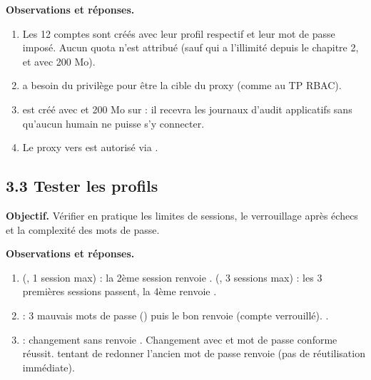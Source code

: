 \textbf{Observations et réponses.}
\begin{enumerate}
  \item Les 12 comptes sont créés avec leur profil respectif et leur mot de passe imposé. Aucun quota n'est attribué (sauf  qui a l'illimité depuis le chapitre 2, et  avec 200 Mo).
  \item {} a besoin du privilège  pour être la cible du proxy (comme  au TP RBAC).
  \item {} est créé avec  et 200 Mo sur  : il recevra les journaux d'audit applicatifs sans qu'aucun humain ne puisse s'y connecter.
  \item Le proxy  vers  est autorisé via .
\end{enumerate}

\subsection{3.3 Tester les profils}
\textbf{Objectif.} Vérifier en pratique les limites de sessions, le verrouillage après échecs et la complexité des mots de passe.

     

\textbf{Observations et réponses.}
\begin{enumerate}
  \item {} (, 1 session max) : la 2ème session renvoie .  (, 3 sessions max) : les 3 premières sessions passent, la 4ème renvoie .
  \item {} : 3 mauvais mots de passe () puis le bon renvoie  (compte verrouillé). .
  \item {} : changement sans  renvoie . Changement avec  et mot de passe conforme réussit.  tentant de redonner l'ancien mot de passe renvoie  (pas de réutilisation immédiate).
\end{enumerate}
